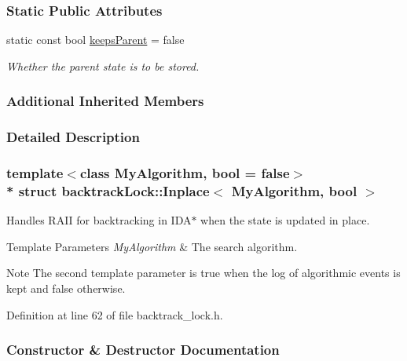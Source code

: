 \subsubsection*{Static Public Attributes}
\begin{DoxyCompactItemize}
\item 
static const bool \hyperlink{structbacktrackLock_1_1Inplace_a18ccf768f2e08ad9100d08541ef0391a}{keeps\+Parent} = false\hypertarget{structbacktrackLock_1_1Inplace_a18ccf768f2e08ad9100d08541ef0391a}{}\label{structbacktrackLock_1_1Inplace_a18ccf768f2e08ad9100d08541ef0391a}

\begin{DoxyCompactList}\small\item\em Whether the parent state is to be stored. \end{DoxyCompactList}\end{DoxyCompactItemize}
\subsubsection*{Additional Inherited Members}


\subsubsection{Detailed Description}
\subsubsection*{template$<$class My\+Algorithm, bool = false$>$\\*
struct backtrack\+Lock\+::\+Inplace$<$ My\+Algorithm, bool $>$}

Handles R\+A\+II for backtracking in I\+D\+A$\ast$ when the state is updated in place. 


\begin{DoxyTemplParams}{Template Parameters}
{\em My\+Algorithm} & The search algorithm. \\
\hline
\end{DoxyTemplParams}
\begin{DoxyNote}{Note}
The second template parameter is {\ttfamily true} when the log of algorithmic events is kept and {\ttfamily false} otherwise. 
\end{DoxyNote}


Definition at line 62 of file backtrack\+\_\+lock.\+h.



\subsubsection{Constructor \& Destructor Documentation}
